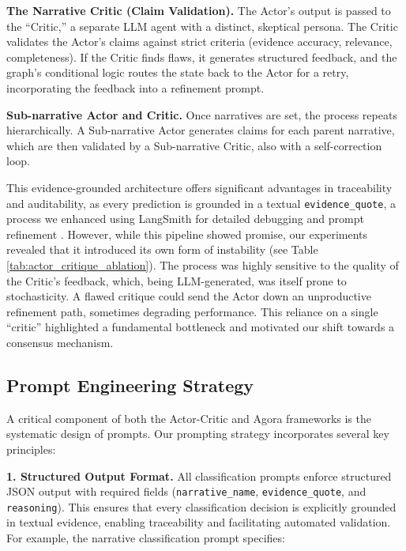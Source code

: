 \textbf{The Narrative Critic (Claim Validation).}
The Actor's output is passed to the ``Critic,'' a separate LLM agent with a distinct, skeptical persona. The Critic validates the Actor's claims against strict criteria (evidence accuracy, relevance, completeness). If the Critic finds flaws, it generates structured feedback, and the graph's conditional logic routes the state back to the Actor for a retry, incorporating the feedback into a refinement prompt.

\textbf{Sub-narrative Actor and Critic.}
Once narratives are set, the process repeats hierarchically. A Sub-narrative Actor generates claims for each parent narrative, which are then validated by a Sub-narrative Critic, also with a self-correction loop.

This evidence-grounded architecture offers significant advantages in traceability and auditability, as every prediction is grounded in a textual \texttt{evidence\_quote}, a process we enhanced using LangSmith for detailed debugging and prompt refinement \citep{langsmith2024}. However, while this pipeline showed promise, our experiments revealed that it introduced its own form of instability (see Table \ref{tab:actor_critique_ablation}). The process was highly sensitive to the quality of the Critic's feedback, which, being LLM-generated, was itself prone to stochasticity. A flawed critique could send the Actor down an unproductive refinement path, sometimes degrading performance. This reliance on a single ``critic'' highlighted a fundamental bottleneck and motivated our shift towards a consensus mechanism.

\subsection{Prompt Engineering Strategy}

A critical component of both the Actor-Critic and Agora frameworks is the systematic design of prompts. %
Our prompting strategy incorporates several key principles:

\noindent\textbf{1. Structured Output Format.} 
All classification prompts enforce structured JSON output with required fields (\texttt{narrative\_name}, \texttt{evidence\_quote}, and \texttt{reasoning}). 
This ensures that every classification decision is explicitly grounded in textual evidence, enabling traceability and facilitating automated validation. For example, the narrative classification prompt specifies:

